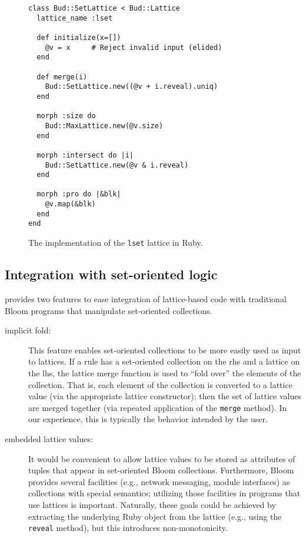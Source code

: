 \begin{figure}[t]
\begin{scriptsize}
\begin{lstlisting}
class Bud::SetLattice < Bud::Lattice
  lattice_name :lset

  def initialize(x=[])
    @v = x     # Reject invalid input (elided)
  end

  def merge(i)
    Bud::SetLattice.new((@v + i.reveal).uniq)
  end

  morph :size do
    Bud::MaxLattice.new(@v.size)
  end

  morph :intersect do |i|
    Bud::SetLattice.new(@v & i.reveal)
  end

  morph :pro do |&blk|
    @v.map(&blk)
  end
end
\end{lstlisting}
\end{scriptsize}
\caption{The implementation of the \texttt{lset} lattice in Ruby.}
\label{fig:lattice-set}
\end{figure}

\subsection{Integration with set-oriented logic}
\label{sec:bloom-interop}

\lang provides two features to ease integration of lattice-based code with
traditional Bloom programs that manipulate set-oriented collections.

\begin{description}
\item[implicit fold:] This feature enables set-oriented collections to be more
  easily used as input to lattices. If a \lang rule has a set-oriented
  collection on the rhs and a lattice on the lhs, the lattice merge function is
  used to ``fold over'' the elements of the collection. That is, each element of
  the collection is converted to a lattice value (via the appropriate lattice
  constructor); then the set of lattice values are merged together (via repeated
  application of the \texttt{merge} method). In our experience, this is
  typically the behavior intended by the user.

\item[embedded lattice values:] It would be convenient to allow lattice values
  to be stored as attributes of tuples that appear in set-oriented Bloom
  collections. Furthermore, Bloom provides several facilities (e.g., network
  messaging, module interfaces) as collections with special semantics; utilizing
  those facilities in programs that use lattices is important. Naturally, these
  goals could be achieved by extracting the underlying Ruby object from the
  lattice (e.g., using the \texttt{reveal} method), but this introduces
  non-monotonicity.
\end{description}

